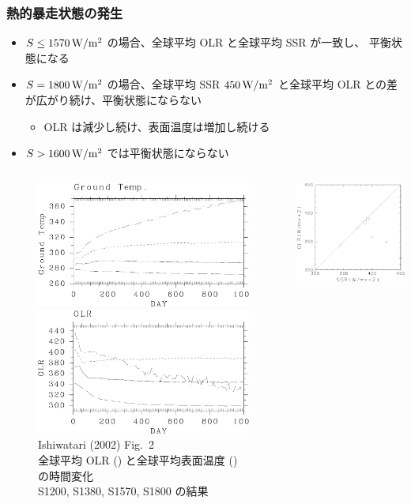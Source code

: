 \documentclass[aspectratio=149,9pt,]{beamer}
\begin{document}
\begin{frame}
	\frametitle{熱的暴走状態の発生}
	\begin{itemize}
		\item \(S\leq1570\hmu{W/m^2}\) の場合、全球平均 OLR と全球平均 SSR が一致し、
			平衡状態になる
		\item \(S=1800\hmu{W/m^2}\) の場合、全球平均 SSR \(450\hmu{W/m^2}\) と全球平均
			OLR との差が広がり続け、平衡状態にならない
			\begin{itemize}
				\item OLR は減少し続け、表面温度は増加し続ける
			\end{itemize}
		\item \(S>1600\hmu{W/m^2}\) では平衡状態にならない
	\end{itemize}
	\begin{columns}[T,onlytextwidth]
		\begin{column}{.7\textwidth}
			\begin{figure}
				\scriptsize
				\includegraphics[width=.45\textwidth]{./fig/Tg-seqs.kps-crop.pdf}
				\includegraphics[width=.45\textwidth]{./fig/OLR-seqs.kps-crop.pdf}\\
				Ishiwatari \etal (2002) Fig.~2\\
				全球平均 OLR () と全球平均表面温度 () の時間変化\\
				S1200, S1380, S1570, S1800 の結果
			\end{figure}
		\end{column}
		\begin{column}{.3\textwidth}
			\centering\scriptsize
			\includegraphics[width=.7\textwidth]{./fig/ISR-OLR.kps-crop.pdf}\\

\end{column}
\end{columns}
\end{frame}
\end{document}
